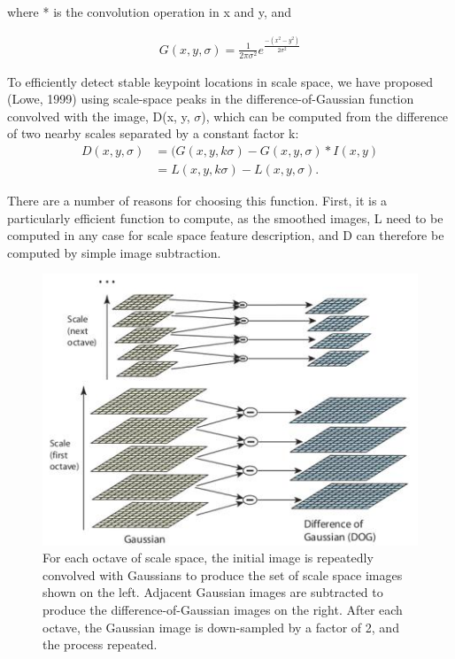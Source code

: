 where * is the convolution operation in x and y, and

\begin{align*} 
 G(x, y,\sigma )  =\frac{1}{2\pi\sigma^2} e^\frac{-( x^2 -  y^2)}{2\sigma^2}  
\end{align*}

To efficiently detect stable keypoint locations in scale space, we have proposed (Lowe,
1999) using scale-space peaks in the difference-of-Gaussian function convolved with the
image, D(x, y, $\sigma$), which can be computed from the difference of two nearby scales separated
by a constant factor k:
\begin{align}
D(x, y, \sigma) &= (G(x, y, k\sigma) - G(x, y,\sigma) * I(x, y)\\
                 &= L(x, y, k\sigma) - L(x, y, \sigma) .
   \end{align}               
                  
There are a number of reasons for choosing this function. First, it is a particularly
efficient function to compute, as the smoothed images, L  need to be computed in any
case for scale space feature description, and D can therefore be computed by simple image
subtraction.

\begin{figure}[H]
\centering
\includegraphics[width=1.0\textwidth]{img/sift_dog.jpg}
\caption{ For each octave of scale space, the initial image is repeatedly convolved with Gaussians to
produce the set of scale space images shown on the left. Adjacent Gaussian images are subtracted
to produce the difference-of-Gaussian images on the right. After each octave, the Gaussian image
is down-sampled by a factor of 2, and the process repeated.}
\label{fig:sift1}
\end{figure}

